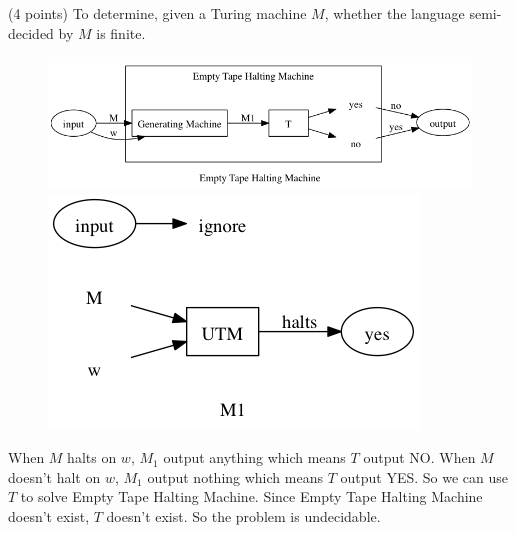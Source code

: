 \documentclass[paper=a4, fontsize=11pt]{scrartcl} %
\begin{document}
\section{}
\begin{fancyquotes}
  (4 points) To determine, given a Turing machine $M$, whether the
  language semi-decided by $M$ is finite.
\end{fancyquotes}

\begin{figure}[H]
  \centering
  \includegraphics[width=\textwidth]{9-9.gv.png}
  \includegraphics[width=.5\textwidth]{9-9.gv.2.png}
\end{figure}

When $M$ halts on $w$, $M_1$ output anything which means $T$ output
NO. When $M$ doesn't halt on $w$, $M_1$ output nothing which means $T$
output YES. So we can use $T$ to solve Empty Tape Halting
Machine. Since Empty Tape Halting Machine doesn't exist, $T$ doesn't
exist. So the problem is undecidable.
\end{document}
